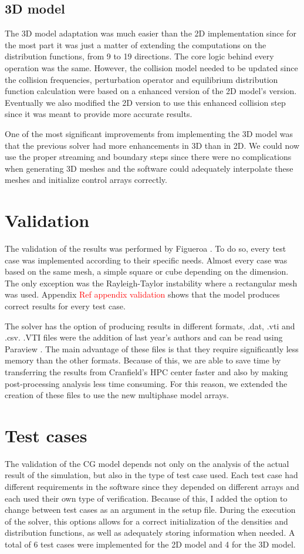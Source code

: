 \documentclass[12pt, openany]{book}
\begin{document}
\subsection{3D model}
The 3D model adaptation was much easier than the 2D implementation since for the most part it was just a matter of extending the computations on the distribution functions, from 9 to 19 directions. The core logic behind every operation was the same. However, the collision model needed to be updated since the collision frequencies, perturbation operator and equilibrium distribution function calculation were based on a enhanced version of the 2D model's version. Eventually we also modified the 2D version to use this enhanced collision step since it was meant to provide more accurate results. \par
One of the most significant improvements from implementing the 3D model was that the previous solver had more enhancements in 3D than in 2D. We could now use the proper streaming and boundary steps since there were no complications when generating 3D meshes and the software could adequately interpolate these meshes and initialize control arrays correctly. 

\section{Validation}
The validation of the results was performed by Figueroa \cite{antonioThesis}. To do so, every test case was implemented according to their specific needs. Almost every case was based on the same mesh, a simple square or cube depending on the dimension. The only exception was the Rayleigh-Taylor instability where a rectangular mesh was used. Appendix \textcolor{red}{Ref appendix validation} shows that the model produces correct results for every test case. \par
The solver has the option of producing results in different formats, .dat, .vti and .csv. .VTI files were the addition of last year's authors and can be read using Paraview \cite{paraview}. The main advantage of these files is that they require significantly less memory than the other formats. Because of this, we are able to save time by transferring the results from Cranfield's HPC center faster and also by making post-processing analysis less time consuming. For this reason, we extended the creation of these files to use the new multiphase model arrays.
\section{Test cases}\label{sec:testcases}
The validation of the CG model depends not only on the analysis of the actual result of the simulation, but also in the type of test case used. Each test case had different requirements in the software since they depended on different arrays and each used their own type of verification. Because of this, I added the option to change between test cases as an argument in the setup file. During the execution of the solver, this options allows for a correct initialization of the densities and distribution functions, as well as adequately storing information when needed.
A total of 6 test cases were implemented for the 2D model and 4 for the 3D model.
\end{document}
